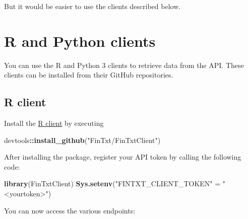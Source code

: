 \documentclass[]{book}
\newenvironment{Shaded}{\begin{snugshade}}{\end{snugshade}}
\newcommand{\KeywordTok}[1]{\textcolor[rgb]{0.13,0.29,0.53}{\textbf{#1}}}
\newcommand{\StringTok}[1]{\textcolor[rgb]{0.31,0.60,0.02}{#1}}
\newcommand{\OperatorTok}[1]{\textcolor[rgb]{0.81,0.36,0.00}{\textbf{#1}}}
\newcommand{\NormalTok}[1]{#1}
\theoremstyle{definition}
\theoremstyle{definition}
\theoremstyle{definition}
\theoremstyle{remark}
\begin{document}
But it would be easier to use the clients described below.

\section{R and Python clients}\label{r-and-python-clients}

You can use the R and Python 3 clients to retrieve data from the API.
These clients can be installed from their GitHub repositories.

\subsection{R client}\label{r-client}

Install the \href{https://github.com/FinTxt/FinTxtClient-R}{R client} by
executing

\begin{Shaded}
\begin{Highlighting}[]
\NormalTok{devtools}\OperatorTok{::}\KeywordTok{install_github}\NormalTok{(}\StringTok{"FinTxt/FinTxtClient"}\NormalTok{)}
\end{Highlighting}
\end{Shaded}

After installing the package, register your API token by calling the
following code:

\begin{Shaded}
\begin{Highlighting}[]
\KeywordTok{library}\NormalTok{(FinTxtClient)}
\KeywordTok{Sys.setenv}\NormalTok{(}\StringTok{"FINTXT_CLIENT_TOKEN"}\NormalTok{ =}\StringTok{ "<yourtoken>"}\NormalTok{)}
\end{Highlighting}
\end{Shaded}

You can now access the various endpoints:
\end{document}
